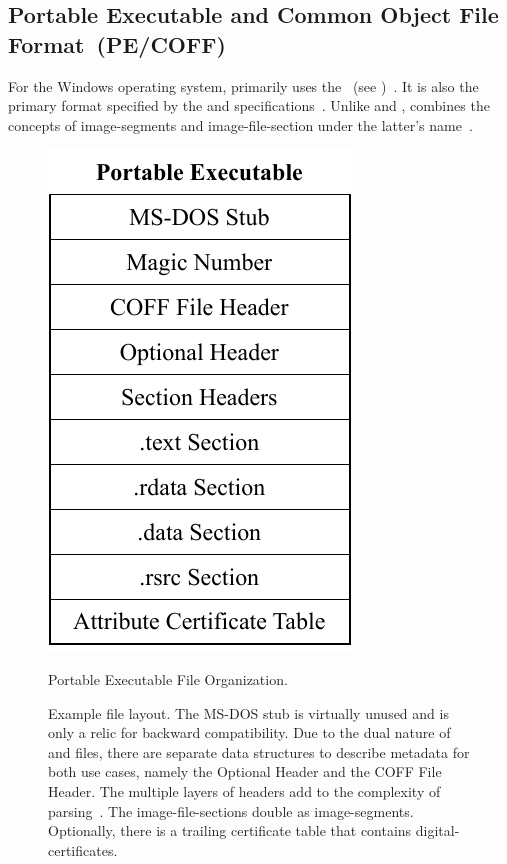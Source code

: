 \subsection{Portable Executable and Common Object File Format~(PE/COFF)}
\label{sec:pecoff}

For the  Windows operating system,  primarily uses the ~(see )~\cite{pe-format}. It is also the primary format specified by the  and  specifications~\cite{pi-spec,uefi-spec}. Unlike  and ,  combines the concepts of \glspl{image-segment} and \gls{image-file-section} under the latter's name~\cite{pe-format}.

\begin{figure}[htb]
  \centering
  \includegraphics{Figures/PE.pdf}
  \caption{Portable Executable File Organization.}
  \label{fig:pe_layout}
  \caption*{Example  file layout. The MS-DOS stub is virtually unused and is only a relic for backward compatibility. Due to the dual nature of  and  files, there are separate data structures to describe metadata for both use cases, namely the Optional Header and the COFF File Header. The multiple layers of headers add to the complexity of  parsing~\cite{secure-pe,audk}. The \glspl{image-file-section} double as \glspl{image-segment}. Optionally, there is a trailing certificate table that contains \glspl{digital-certificate}.}
\end{figure}


